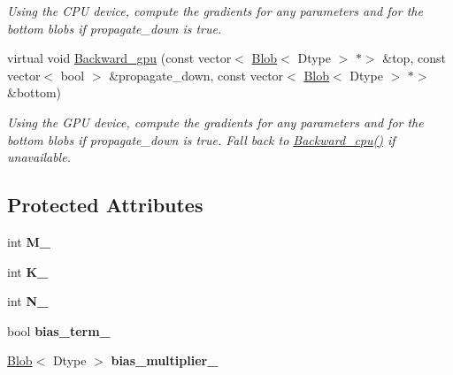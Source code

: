 \begin{DoxyCompactItemize}
\begin{DoxyCompactList}\small\item\em Using the C\+PU device, compute the gradients for any parameters and for the bottom blobs if propagate\+\_\+down is true. \end{DoxyCompactList}\item 
\mbox{\label{classcaffe_1_1_embed_layer_a87bab7b95ab417077a06cf8ad329f908}} 
virtual void \mbox{\hyperlink{classcaffe_1_1_embed_layer_a87bab7b95ab417077a06cf8ad329f908}{Backward\+\_\+gpu}} (const vector$<$ \mbox{\hyperlink{classcaffe_1_1_blob}{Blob}}$<$ Dtype $>$ $\ast$$>$ \&top, const vector$<$ bool $>$ \&propagate\+\_\+down, const vector$<$ \mbox{\hyperlink{classcaffe_1_1_blob}{Blob}}$<$ Dtype $>$ $\ast$$>$ \&bottom)
\begin{DoxyCompactList}\small\item\em Using the G\+PU device, compute the gradients for any parameters and for the bottom blobs if propagate\+\_\+down is true. Fall back to \mbox{\hyperlink{classcaffe_1_1_embed_layer_a0584f1e1429283eb9ddf4c5bbb897a2d}{Backward\+\_\+cpu()}} if unavailable. \end{DoxyCompactList}\end{DoxyCompactItemize}
\subsection*{Protected Attributes}
\begin{DoxyCompactItemize}
\item 
\mbox{\label{classcaffe_1_1_embed_layer_ab141ec84d4a4617c69534594f32de458}} 
int {\bfseries M\+\_\+}
\item 
\mbox{\label{classcaffe_1_1_embed_layer_a4c3ea441f384c996a22bf5f5927119a5}} 
int {\bfseries K\+\_\+}
\item 
\mbox{\label{classcaffe_1_1_embed_layer_a47e98f5f2b174d63e5563391d27e61c7}} 
int {\bfseries N\+\_\+}
\item 
\mbox{\label{classcaffe_1_1_embed_layer_aa961db47dca56c819cf9b6c185227cbd}} 
bool {\bfseries bias\+\_\+term\+\_\+}
\item 
\mbox{\label{classcaffe_1_1_embed_layer_a1331d191002225cbf2354ff1ec8f2c30}} 
\mbox{\hyperlink{classcaffe_1_1_blob}{Blob}}$<$ Dtype $>$ {\bfseries bias\+\_\+multiplier\+\_\+}
\end{DoxyCompactItemize}


